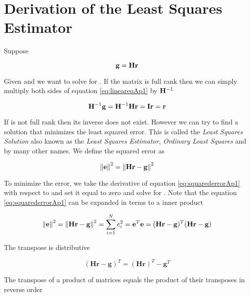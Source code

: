 \chapter{Derivation of the Least Squares Estimator}\label{app:Derivation of the Least Squares Estimator}


Suppose 

\begin{equation}\label{eq:lineareqAp1}
	\mathbf{g} = \mathbf{Hr} 
\end{equation}

Given  and  we want to solve for . If the matrix is full rank then we can simply multiply both sides of equation \ref{eq:lineareqAp1} by $\mathbf{H}^{-1}$ 

\begin{equation}
	\mathbf{H}^{-1} \mathbf{g} = \mathbf{H}^{-1} \mathbf{Hr} = \mathbf{I} \mathbf{r} = \mathbf{r}
\end{equation}

If  is not full rank then its inverse does not exist. However we can try to find a solution  that minimizes the least squared error. This is called the \emph{Least Squares Solution} also known as the \emph{Least Squares Estimator}, \emph{Ordinary Least Squares} and by many other names. We define the squared error as

\begin{equation}\label{eq:squarederrorAp1}
	\mathbf{ \lVert \mathbf{e} \rVert }^2 =    \mathbf{ \lVert \mathbf{Hr-g} \rVert }^2
\end{equation}

\noindent To minimize the error, we take the derivative of equation \ref{eq:squarederrorAp1} with respect to  and set it equal to zero and solve for . Note that the equation \ref{eq:squarederrorAp1} can be expanded in terms to a inner product 

\begin{equation} \label{eq:squarederrorAp2}
	\mathbf{ \lVert \mathbf{e} \rVert }^2 =    \mathbf{ \lVert \mathbf{Hr-g} \rVert }^2 = \sum_{i=1}^{N} e_i^{2} = \mathbf{e}^T \mathbf{e} =(\mathbf{Hr-g} ) ^{T} ( \mathbf{Hr-g} )
\end{equation}

\noindent The transpose is distributive 

\begin{equation}
	 ( \mathbf{Hr-g} )^{T} = ( \mathbf{Hr} )^{T} - \mathbf{g}^{T} 
\end{equation}

\noindent The transpose of a product of matrices equals the product of their transposes in reverse order

